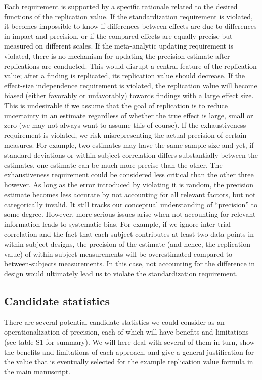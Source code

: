 \documentclass[]{article}
\begin{document}
Each requirement is supported by a specific rationale related to the
desired functions of the replication value. If the standardization
requirement is violated, it becomes impossible to know if differences
between effects are due to differences in impact and precision, or if
the compared effects are equally precise but measured on different
scales. If the meta-analytic updating requirement is violated, there is
no mechanism for updating the precision estimate after replications are
conducted. This would disrupt a central feature of the replication
value; after a finding is replicated, its replication value should
decrease. If the effect-size independence requirement is violated, the
replication value will become biased (either favorably or unfavorably)
towards findings with a large effect size. This is undesirable if we
assume that the goal of replication is to reduce uncertainty in an
estimate regardless of whether the true effect is large, small or zero
(we may not always want to assume this of course). If the exhaustiveness
requirement is violated, we risk misrepresenting the actual precision of
certain measures. For example, two estimates may have the same sample
size and yet, if standard deviations or within-subject correlation
differs substantially between the estimates, one estimate can be much
more precise than the other. The exhaustiveness requirement could be
considered less critical than the other three however. As long as the
error introduced by violating it is random, the precision estimate
becomes less accurate by not accounting for all relevant factors, but
not categorically invalid. It still tracks our conceptual understanding
of ``precision'' to some degree. However, more serious issues arise when
not accounting for relevant information leads to systematic bias. For
example, if we ignore inter-trial correlation and the fact that each
subject contributes at least two data points in within-subject designs,
the precision of the estimate (and hence, the replication value) of
within-subject measurements will be overestimated compared to
between-subjects measurements. In this case, not accounting for the
difference in design would ultimately lead us to violate the
standardization requirement.

\hypertarget{candidate-statistics}{%
\subsection{Candidate statistics}\label{candidate-statistics}}

There are several potential candidate statistics we could consider as an
operationalization of precision, each of which will have benefits and
limitations (see table S1 for summary). We will here deal with several
of them in turn, show the benefits and limitations of each approach, and
give a general justification for the value that is eventually selected
for the example replication value formula in the main manuscript.
\end{document}
